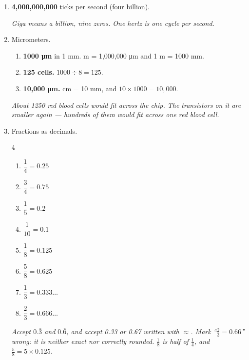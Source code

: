 \documentclass[12pt, twoside]{article}
\begin{document}
\begin{enumerate}[itemsep=0.45cm]
\item \textbf{4{,}000{,}000{,}000} ticks per second (four billion).

  \emph{Giga means a billion, nine zeros. One hertz is one cycle per second.}

\item Micrometers.
  \begin{enumerate}[itemsep=0.2cm]
    \item \textbf{1000 \si{\micro\metre}} in 1 mm.  m = 1{,}000{,}000 \si{\micro\metre} and 1 m = 1000 mm.
    \item \textbf{125 cells.} \quad $1000 \div 8 = 125$.
    \item \textbf{10{,}000 \si{\micro\metre}.}  cm = 10 mm, and
      $10 \times 1000 = 10{,}000$.
  \end{enumerate}
  \emph{About 1250 red blood cells would fit across the chip. The transistors on it
  are smaller again --- hundreds of them would fit across one red blood cell.}

\newpage

\item Fractions as decimals.
  \begin{multicols}{4}
    \begin{enumerate}[itemsep=0.25cm]
      \item $\dfrac{1}{4} = \mathbf{0.25}$
      \item $\dfrac{3}{4} = \mathbf{0.75}$
      \item $\dfrac{1}{5} = \mathbf{0.2}$
      \item $\dfrac{1}{10} = \mathbf{0.1}$
      \item $\dfrac{1}{8} = \mathbf{0.125}$
      \item $\dfrac{5}{8} = \mathbf{0.625}$
      \item $\dfrac{1}{3} = \mathbf{0.333\ldots}$
      \item $\dfrac{2}{3} = \mathbf{0.666\ldots}$
    \end{enumerate}
  \end{multicols}
  \emph{Accept $0.\overline{3}$ and $0.\overline{6}$, and accept 0.33 or 0.67 written
  with $\approx$. Mark ``$\frac{2}{3} = 0.66$'' wrong: it is neither exact nor
  correctly rounded. $\frac{1}{8}$ is half of $\frac{1}{4}$, and
  $\frac{5}{8} = 5 \times 0.125$.}


\end{enumerate}
\end{document}
